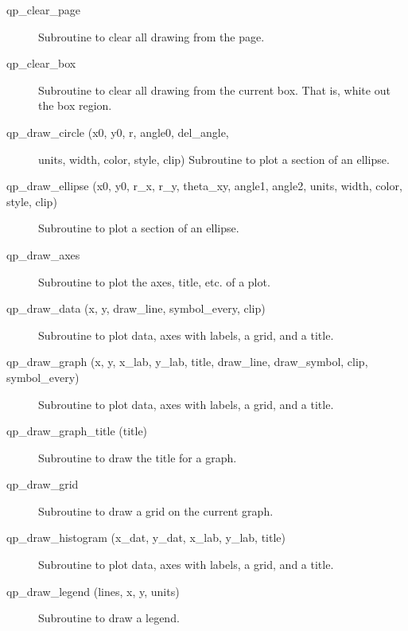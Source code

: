\begin{description}

\item[qp_clear_page] \Newline 
     Subroutine to clear all drawing from the page.

\item[qp_clear_box] \Newline 
     Subroutine to clear all drawing from the current box.
     That is, white out the box region.

\item[qp_draw_circle (x0, y0, r, angle0, del_angle, ] \Newline 
                                   units, width, color, style, clip)
Subroutine to plot a section of an ellipse.

\item[qp_draw_ellipse (x0, y0, r_x, r_y, theta_xy, angle1, angle2, 
                     units, width, color, style, clip) ] \Newline 
     Subroutine to plot a section of an ellipse.

\item[qp_draw_axes] \Newline 
     Subroutine to plot the axes, title, etc. of a plot.

\item[qp_draw_data (x, y, draw_line, symbol_every, clip)] \Newline
     Subroutine to plot data, axes with labels, a grid, and a title.

\item[qp_draw_graph (x, y, x_lab, y_lab, title, 
                  draw_line, draw_symbol, clip, symbol_every) ] \Newline 
     Subroutine to plot data, axes with labels, a grid, and a title.

\item[qp_draw_graph_title (title)] \Newline 
     Subroutine to draw the title for a graph.

\item[qp_draw_grid] \Newline 
     Subroutine to draw a grid on the current graph.

\item[qp_draw_histogram (x_dat, y_dat, x_lab, y_lab, title)] \Newline 
     Subroutine to plot data, axes with labels, a grid, and a title.

\item[qp_draw_legend (lines, x, y, units)] \Newline 
     Subroutine to draw a legend.


\end{description}
